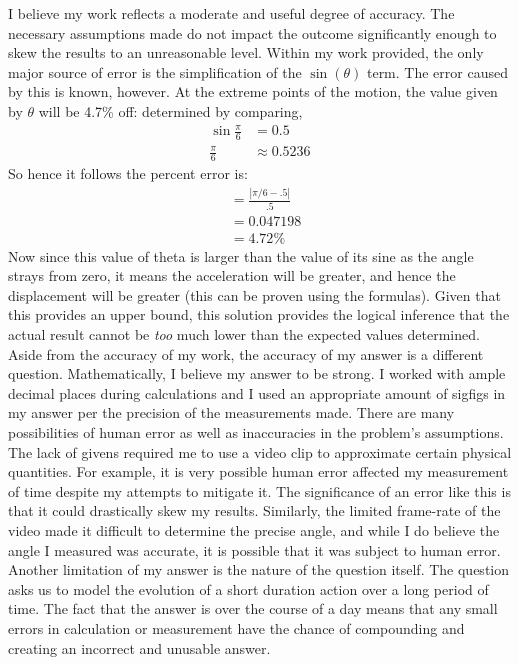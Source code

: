\documentclass[11pt,a4paper]{article}
\begin{document}
I believe my work reflects a moderate and useful degree of accuracy.  The necessary assumptions made do not impact the outcome significantly enough to skew the results to an unreasonable level.  Within my work provided,  the only major source of error is the simplification of the $\sin (\theta)$ term.  The error caused by this is known,  however.  At the extreme points of the motion,  the value given by $\theta$ will be 4.7\% off: determined by comparing,
\begin{align}
\sin \frac{\pi}{6} &= 0.5 \\
\frac{\pi}{6} &\approx 0.5236
\end{align}
So hence it follows the percent error is:
\begin{align}
&= \frac{|\pi / 6 - .5|}{.5}\\
&= 0.047198\\
&= 4.72\%
\end{align}
Now since this value of theta is larger than the value of its sine as the angle strays from zero,  it means the acceleration will be greater,  and hence the displacement will be greater (this can be proven using the formulas).  Given that this provides an upper bound,  this solution provides the logical inference that the actual result cannot be \textit{too} much lower than the expected values determined. \\

Aside from the accuracy of my work,  the accuracy of my answer is a different question.  Mathematically,  I believe my answer to be strong.  I worked with ample decimal places during calculations and I used an appropriate amount of sigfigs in my answer per the precision of the measurements made.  There are many possibilities of human error as well as inaccuracies in the problem's assumptions.  The lack of givens required me to use a video clip to approximate certain physical quantities.  For example,  it is very possible human error affected my measurement of time despite my attempts to mitigate it.  The significance of an error like this is that it could drastically skew my results.  Similarly,  the limited frame-rate of the video made it difficult to determine the precise angle,  and while I do believe the angle I measured was accurate,  it is possible that it was subject to human error.  Another limitation of my answer is the nature of the question itself.  The question asks us to model the evolution of a short duration action over a long period of time.  The fact that  the answer is over the course of a day means that any small errors in calculation or measurement have the chance of compounding and creating an incorrect and unusable answer.  
\end{document}
